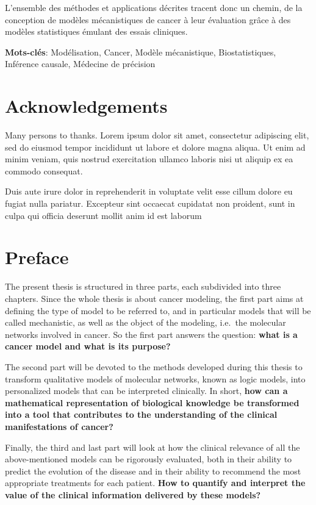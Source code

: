 \documentclass[a4paper,12pt,twoside,onecolumn,openright,final,oldfontcommands]{memoir}
\newcommand{\initial}[1]{
	\lettrine[lines=3,lhang=0.33,nindent=0em]{
		\color{gray}
     		{\textsc{#1}}}{}}
\newcommand\blankpage{%
    \null
    \thispagestyle{empty}%
    \newpage
    }
\newcommand{\clearemptydoublepage}{\newpage{\thispagestyle{empty}\cleardoublepage}}
\begin{document}
L'ensemble des méthodes et applications décrites tracent donc un chemin,
de la conception de modèles mécanistiques de cancer à leur évaluation
grâce à des modèles statistiques émulant des essais cliniques.

\vspace{\baselineskip}

\textbf{Mots-clés}: Modélisation, Cancer, Modèle mécanistique,
Biostatistiques, Inférence causale, Médecine de précision

\afterpage{\blankpage}

\chapter*{Acknowledgements}

\initial{M}any persons to thanks. Lorem ipsum dolor sit amet,
consectetur adipiscing elit, sed do eiusmod tempor incididunt ut labore
et dolore magna aliqua. Ut enim ad minim veniam, quis nostrud
exercitation ullamco laboris nisi ut aliquip ex ea commodo consequat.

Duis aute irure dolor in reprehenderit in voluptate velit esse cillum
dolore eu fugiat nulla pariatur. Excepteur sint occaecat cupidatat non
proident, sunt in culpa qui officia deserunt mollit anim id est laborum

\clearemptydoublepage

\chapter*{Preface}

\initial{T}he present thesis is structured in three parts, each
subdivided into three chapters. Since the whole thesis is about cancer
modeling, the first part aims at defining the type of model to be
referred to, and in particular models that will be called mechanistic,
as well as the object of the modeling, i.e.~the molecular networks
involved in cancer. So the first part answers the question: \textbf{what
is a cancer model and what is its purpose?}

The second part will be devoted to the methods developed during this
thesis to transform qualitative models of molecular networks, known as
logic models, into personalized models that can be interpreted
clinically. In short, \textbf{how can a mathematical representation of
biological knowledge be transformed into a tool that contributes to the
understanding of the clinical manifestations of cancer?}

Finally, the third and last part will look at how the clinical relevance
of all the above-mentioned models can be rigorously evaluated, both in
their ability to predict the evolution of the disease and in their
ability to recommend the most appropriate treatments for each patient.
\textbf{How to quantify and interpret the value of the clinical
information delivered by these models?}
\end{document}
